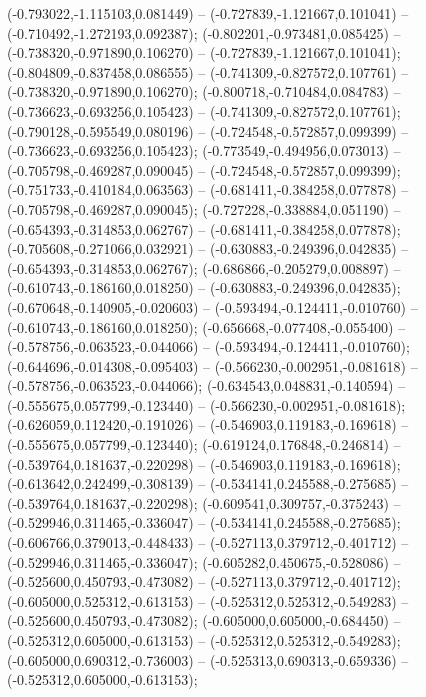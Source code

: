  (-0.793022,-1.115103,0.081449) -- (-0.727839,-1.121667,0.101041) -- (-0.710492,-1.272193,0.092387);
 (-0.802201,-0.973481,0.085425) -- (-0.738320,-0.971890,0.106270) -- (-0.727839,-1.121667,0.101041);
 (-0.804809,-0.837458,0.086555) -- (-0.741309,-0.827572,0.107761) -- (-0.738320,-0.971890,0.106270);
 (-0.800718,-0.710484,0.084783) -- (-0.736623,-0.693256,0.105423) -- (-0.741309,-0.827572,0.107761);
 (-0.790128,-0.595549,0.080196) -- (-0.724548,-0.572857,0.099399) -- (-0.736623,-0.693256,0.105423);
 (-0.773549,-0.494956,0.073013) -- (-0.705798,-0.469287,0.090045) -- (-0.724548,-0.572857,0.099399);
 (-0.751733,-0.410184,0.063563) -- (-0.681411,-0.384258,0.077878) -- (-0.705798,-0.469287,0.090045);
 (-0.727228,-0.338884,0.051190) -- (-0.654393,-0.314853,0.062767) -- (-0.681411,-0.384258,0.077878);
 (-0.705608,-0.271066,0.032921) -- (-0.630883,-0.249396,0.042835) -- (-0.654393,-0.314853,0.062767);
 (-0.686866,-0.205279,0.008897) -- (-0.610743,-0.186160,0.018250) -- (-0.630883,-0.249396,0.042835);
 (-0.670648,-0.140905,-0.020603) -- (-0.593494,-0.124411,-0.010760) -- (-0.610743,-0.186160,0.018250);
 (-0.656668,-0.077408,-0.055400) -- (-0.578756,-0.063523,-0.044066) -- (-0.593494,-0.124411,-0.010760);
 (-0.644696,-0.014308,-0.095403) -- (-0.566230,-0.002951,-0.081618) -- (-0.578756,-0.063523,-0.044066);
 (-0.634543,0.048831,-0.140594) -- (-0.555675,0.057799,-0.123440) -- (-0.566230,-0.002951,-0.081618);
 (-0.626059,0.112420,-0.191026) -- (-0.546903,0.119183,-0.169618) -- (-0.555675,0.057799,-0.123440);
 (-0.619124,0.176848,-0.246814) -- (-0.539764,0.181637,-0.220298) -- (-0.546903,0.119183,-0.169618);
 (-0.613642,0.242499,-0.308139) -- (-0.534141,0.245588,-0.275685) -- (-0.539764,0.181637,-0.220298);
 (-0.609541,0.309757,-0.375243) -- (-0.529946,0.311465,-0.336047) -- (-0.534141,0.245588,-0.275685);
 (-0.606766,0.379013,-0.448433) -- (-0.527113,0.379712,-0.401712) -- (-0.529946,0.311465,-0.336047);
 (-0.605282,0.450675,-0.528086) -- (-0.525600,0.450793,-0.473082) -- (-0.527113,0.379712,-0.401712);
 (-0.605000,0.525312,-0.613153) -- (-0.525312,0.525312,-0.549283) -- (-0.525600,0.450793,-0.473082);
 (-0.605000,0.605000,-0.684450) -- (-0.525312,0.605000,-0.613153) -- (-0.525312,0.525312,-0.549283);
 (-0.605000,0.690312,-0.736003) -- (-0.525313,0.690313,-0.659336) -- (-0.525312,0.605000,-0.613153);
